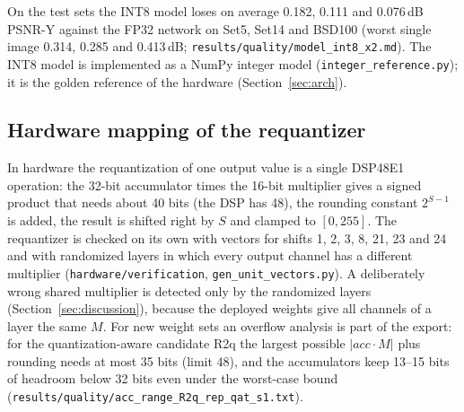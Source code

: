 \documentclass[conference]{IEEEtran}
\begin{document}
\begin{table}[t]
\caption{PTQ percentile sweep, per-layer weight scales, 12 validation images (FP32 reference 34.954\,dB PSNR-Y).}\label{tab:ptq}
\centering
{}
\end{table}

On the test sets the INT8 model loses on average 0.182, 0.111 and 0.076\,dB PSNR-Y against the FP32 network on Set5, Set14 and BSD100
(worst single image 0.314, 0.285 and 0.413\,dB; \texttt{results/\allowbreak{}quality/\allowbreak{}model\_int8\_x2.md}).
The INT8 model is implemented as a NumPy integer model (\texttt{integer\_reference.py}); it is the golden reference of the hardware (Section~\ref{sec:arch}).

\subsection{Hardware mapping of the requantizer}
In hardware the requantization of one output value is a single DSP48E1 operation: the 32-bit accumulator times the 16-bit multiplier gives a signed product that needs about 40 bits (the DSP has 48), the rounding constant $2^{S-1}$ is added, the result is shifted right by $S$ and clamped to $[0,255]$.
The requantizer is checked on its own with vectors for shifts 1, 2, 3, 8, 21, 23 and 24 and with randomized layers in which every output channel has a different multiplier (\texttt{hardware/\allowbreak{}verification}, \texttt{gen\_unit\_vectors.py}). A deliberately wrong shared multiplier is detected only by the randomized layers (Section~\ref{sec:discussion}), because the deployed weights give all channels of a layer the same $M$.
For new weight sets an overflow analysis is part of the export: for the quantization-aware candidate R2q the largest possible $|acc\cdot M|$ plus rounding needs at most 35 bits (limit 48), and the accumulators keep 13--15 bits of headroom below 32 bits even under the worst-case bound (\texttt{results/\allowbreak{}quality/\allowbreak{}acc\_range\_R2q\_rep\_qat\_s1.txt}).
\end{document}
